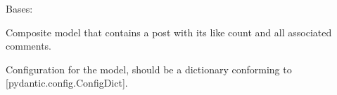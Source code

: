 \documentclass[letterpaper,10pt,openany,oneside,english]{sphinxmanual}
\begin{document}
\begin{savenotes}\begin{fulllineitems}

\pysigstartsignatures
{}
\pysigstopsignatures
\sphinxAtStartPar
Bases: 

\sphinxAtStartPar
Composite model that contains a post with its like count
and all associated comments.


\begin{savenotes}\begin{fulllineitems}

\pysigstartsignatures
{}
\pysigstopsignatures
\end{fulllineitems}\end{savenotes}



\begin{savenotes}\begin{fulllineitems}

\pysigstartsignatures
{}
\pysigstopsignatures
\sphinxAtStartPar
Configuration for the model, should be a dictionary conforming to {[}\sphinxtitleref{ConfigDict}{]}{[}pydantic.config.ConfigDict{]}.

\end{fulllineitems}\end{savenotes}



\begin{savenotes}\begin{fulllineitems}

\pysigstartsignatures
{}
\pysigstopsignatures
\end{fulllineitems}\end{savenotes}


\end{fulllineitems}\end{savenotes}
\end{document}
